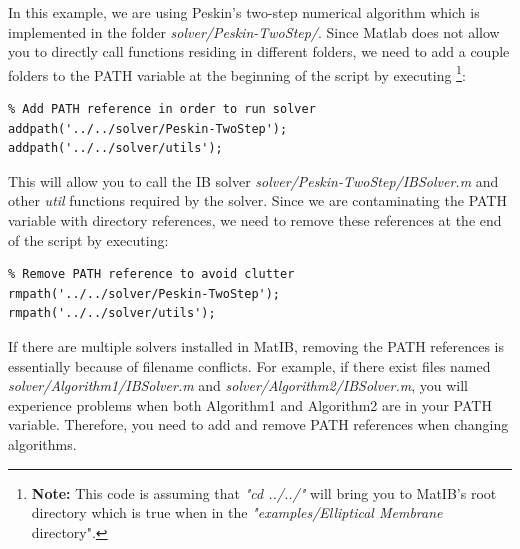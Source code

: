 \documentclass{article}
\begin{document}
In this example, we are using Peskin's two-step numerical algorithm \cite{PeskinIB} which is implemented in the folder \emph{solver/Peskin-TwoStep/}. 
Since Matlab does not allow you to directly call functions residing in different folders, we need to add a couple folders to the PATH variable at the beginning of the script by executing
\footnote{{\bf Note:} This code is assuming that \emph{"cd ../../"} will bring you to MatIB's root directory which is true when in the \emph{"examples/Elliptical Membrane} directory".}:
\begin{lstlisting}
% Add PATH reference in order to run solver
addpath('../../solver/Peskin-TwoStep');
addpath('../../solver/utils');
\end{lstlisting}
This will allow you to call the IB solver \emph{solver/Peskin-TwoStep/IBSolver.m} and other \emph{util} functions required by the solver. Since 
we are contaminating the PATH variable with directory references, we need to remove these references at the end of the script by executing:
\begin{lstlisting}
% Remove PATH reference to avoid clutter
rmpath('../../solver/Peskin-TwoStep');
rmpath('../../solver/utils');
\end{lstlisting}
If there are multiple solvers installed in MatIB, removing the PATH references is essentially because of filename conflicts. For example, 
if there exist files named \emph{solver/Algorithm1/IBSolver.m} and \emph{solver/Algorithm2/IBSolver.m}, 
you will experience problems when both Algorithm1 and Algorithm2 are in your PATH variable. Therefore, you need to add and remove PATH references when 
changing algorithms.
\end{document}
